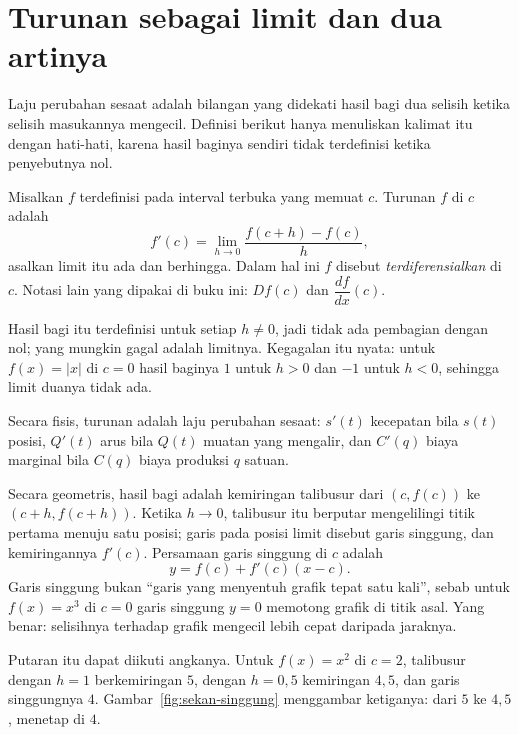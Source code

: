\section{Turunan sebagai limit dan dua artinya}

Laju perubahan sesaat adalah bilangan yang didekati hasil bagi dua selisih ketika selisih
masukannya mengecil. Definisi berikut hanya menuliskan kalimat itu dengan hati-hati, karena
hasil baginya sendiri tidak terdefinisi ketika penyebutnya nol.


\begin{definisi}
Misalkan $f$ terdefinisi pada interval terbuka yang memuat $c$. Turunan $f$ di $c$ adalah
\[
  f'(c)=\lim_{h\to0}\frac{f(c+h)-f(c)}{h},
\]
asalkan limit itu ada dan berhingga. Dalam hal ini $f$ disebut
\emph{terdiferensialkan} di $c$. Notasi lain yang dipakai di buku ini: $Df(c)$ dan
$\dfrac{df}{dx}(c)$.
\end{definisi}

Hasil bagi itu terdefinisi untuk setiap $h\neq0$, jadi tidak ada pembagian dengan nol; yang
mungkin gagal adalah limitnya. Kegagalan itu nyata: untuk $f(x)=|x|$ di $c=0$ hasil baginya
$1$ untuk $h>0$ dan $-1$ untuk $h<0$, sehingga limit duanya tidak ada.

Secara fisis, turunan adalah laju perubahan sesaat: $s'(t)$ kecepatan bila $s(t)$ posisi,
$Q'(t)$ arus bila $Q(t)$ muatan yang mengalir, dan $C'(q)$ biaya marginal bila $C(q)$ biaya
produksi $q$ satuan.

Secara geometris, hasil bagi adalah kemiringan talibusur dari $(c,f(c))$ ke
$(c+h,f(c+h))$. Ketika $h\to0$, talibusur itu berputar mengelilingi titik pertama menuju satu
posisi; garis pada posisi limit disebut garis singgung, dan kemiringannya $f'(c)$. Persamaan
garis singgung di $c$ adalah
\[
  y=f(c)+f'(c)(x-c).
\]
Garis singgung bukan ``garis yang menyentuh grafik tepat satu kali'', sebab untuk
$f(x)=x^{3}$ di $c=0$ garis singgung $y=0$ memotong grafik di titik asal. Yang benar:
selisihnya terhadap grafik mengecil lebih cepat daripada jaraknya.

Putaran itu dapat diikuti angkanya. Untuk $f(x)=x^{2}$ di $c=2$, talibusur dengan $h=1$
berkemiringan $5$, dengan $h=0{,}5$ kemiringan $4{,}5$, dan garis singgungnya $4$.
Gambar~\ref{fig:sekan-singgung} menggambar ketiganya: dari $5$ ke $4{,}5$, menetap di $4$.

